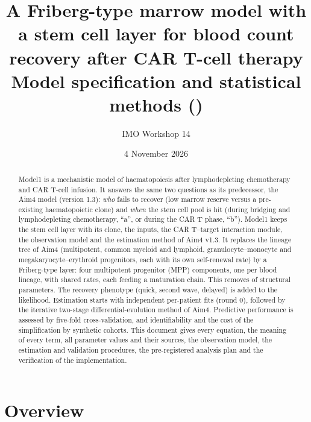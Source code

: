 \documentclass[11pt]{article}
\title{A Friberg-type marrow model with a stem cell layer for blood count recovery after CAR T-cell therapy\\[4pt]
\large Model specification and statistical methods (\valVersion)}
\author{IMO Workshop 14}
\date{4 November 2026}
\begin{document}
\maketitle

\begin{abstract}
\noindent Model1 is a mechanistic model of haematopoiesis after lymphodepleting chemotherapy and CAR T-cell infusion. It answers the same two questions as its predecessor, the Aim4 model (version 1.3): \emph{who} fails to recover (low marrow reserve versus a pre-existing haematopoietic clone) and \emph{when} the stem cell pool is hit (during bridging and lymphodepleting chemotherapy, ``a'', or during the CAR T phase, ``b''). Model1 keeps the stem cell layer with its clone, the inputs, the CAR T--target interaction module, the observation model and the estimation method of Aim4 v1.3. It replaces the lineage tree of Aim4 (multipotent, common myeloid and lymphoid, granulocyte--monocyte and megakaryocyte--erythroid progenitors, each with its own self-renewal rate) by a Friberg-type layer: four multipotent progenitor (MPP) components, one per blood lineage, with shared rates, each feeding a maturation chain. This removes \valReduction{} of \valNStructAimFour{} structural parameters. The recovery phenotype (quick, second wave, delayed) is added to the likelihood. Estimation starts with independent per-patient fits (round 0), followed by the iterative two-stage differential-evolution method of Aim4. Predictive performance is assessed by five-fold cross-validation, and identifiability and the cost of the simplification by synthetic cohorts. This document gives every equation, the meaning of every term, all parameter values and their sources, the observation model, the estimation and validation procedures, the pre-registered analysis plan and the verification of the implementation.
\end{abstract}

\tableofcontents
\clearpage

\section{Overview}
\end{document}
